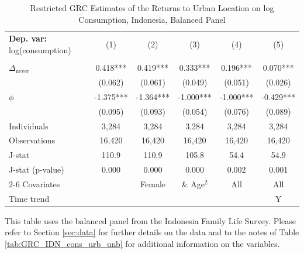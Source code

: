 \begin{table}[htb!] \centering \begin{threeparttable}
 \caption{Restricted GRC Estimates of the Returns to Urban Location on log Consumption, Indonesia, Balanced Panel} 
 \label{tab:GRC_IDN_cons_urb_bal} 
\begin{tabular}{l ccccc} \toprule  \textbf{Dep. var:}  log(consumption) 
                    &\multicolumn{1}{c}{(1)}   &\multicolumn{1}{c}{(2)}   &\multicolumn{1}{c}{(3)}   &\multicolumn{1}{c}{(4)}   &\multicolumn{1}{c}{(5)}   \\
                    &               &               &               &               &               \\
\addlinespace
$\Delta_{\text{never}}$&    0.418***&       0.419***&       0.333***&       0.196***&       0.070***\\
                    &     (0.062)   &     (0.061)   &     (0.049)   &     (0.051)   &     (0.026)   \\
\addlinespace
$\phi$              &      -1.375***&      -1.364***&      -1.000***&      -1.000***&      -0.429***\\
                    &     (0.095)   &     (0.093)   &     (0.054)   &     (0.076)   &     (0.089)   \\
\addlinespace
Individuals         &       3,284   &       3,284   &       3,284   &       3,284   &       3,284   \\
Observations        &      16,420   &      16,420   &      16,420   &      16,420   &      16,420   \\
J-stat              &       110.9   &       110.9   &       105.8   &        54.4   &        54.9   \\
J-stat (p-value)    &       0.000   &       0.000   &       0.000   &       0.002   &       0.001   \\
\cmidrule{2-6} Covariates & & Female & \& Age$^2$ & All & All  \\ Time trend & & & & & Y \\ \bottomrule \end{tabular} \begin{tablenotes} \footnotesize \item{This table uses the balanced panel from the Indonesia Family Life Survey. Please refer to Section \ref{sec:data} for further details on the data and to the notes of Table \ref{tab:GRC_IDN_cons_urb_unb} for additional information on the variables. 
}
\end{tablenotes}
\end{threeparttable}
\end{table}
